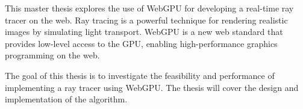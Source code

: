 
This master thesis explores the use of WebGPU for developing a real-time ray tracer on the web. Ray tracing is a powerful technique for rendering realistic images by simulating light transport. WebGPU is a new web standard that provides low-level access to the GPU, enabling high-performance graphics programming on the web.

The goal of this thesis is to investigate the feasibility and performance of implementing a ray tracer using WebGPU. The thesis will cover the design and implementation of the algorithm.
